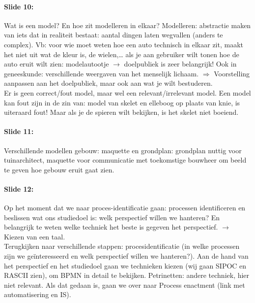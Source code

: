 \documentclass[10pt,a4paper]{report}
\begin{document}
\paragraph{Slide 10:}Wat is een model? En hoe zit modelleren in elkaar? Modelleren: abstractie maken van iets dat in realiteit bestaat: aantal dingen laten wegvallen (anders te complex). Vb: voor wie moet weten hoe een auto technisch in elkaar zit, maakt het niet uit wat de kleur is, de wielen,… als je aan gebruiker wilt tonen hoe de auto eruit wilt zien: modelautootje $\rightarrow$ doelpubliek is zeer belangrijk!
Ook in geneeskunde: verschillende weergaven van het menselijk lichaam. $\Rightarrow$ Voorstelling aanpassen aan het doelpubliek, maar ook aan wat je wilt bestuderen.\\
Er is geen correct/fout model, maar wel een relevant/irrelevant model. Een model kan fout zijn in de zin van: model van skelet en elleboog op plaats van knie, is uiteraard fout! Maar als je de spieren wilt bekijken, is het skelet niet boeiend.

\paragraph{Slide 11:}Verschillende modellen gebouw: maquette en grondplan: grondplan nuttig voor tuinarchitect, maquette voor communicatie met toekomstige bouwheer om beeld te geven hoe gebouw eruit gaat zien.

\paragraph{Slide 12:}Op het moment dat we naar proces-identificatie gaan: processen identificeren en beslissen wat ons studiedoel is: welk perspectief willen we hanteren? En belangrijk te weten welke techniek het beste is gegeven het perspectief. $\rightarrow$ Kiezen van een taal.\\
Terugkijken naar verschillende stappen: procesidentificatie (in welke processen zijn we geïnteresseerd en welk perspectief willen we hanteren?). Aan de hand van het perspectief en het studiedoel gaan we technieken kiezen (wij gaan SIPOC en RASCII zien), om BPMN in detail te bekijken. Petrinetten: andere techniek, hier niet relevant. Als dat gedaan is, gaan we over naar Process enactment (link met automatisering en IS).
\end{document}

